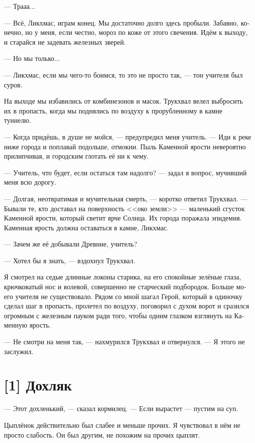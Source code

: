 \documentclass[a4paper,12pt,fleqn]{book}\usepackage{cooltooltips}\usepackage{polyglossia}\setdefaultlanguage[babelshorthands=true]{russian}\setotherlanguage{english}\defaultfontfeatures{Ligatures=TeX,Mapping=tex-text} \usepackage{xcolor}\definecolor{lightgray}{HTML}{bbbbbb}\color{lightgray}\newcommand{\ml}[3]{\textenglish{\textcolor{black}{#3}}}
\newcommand{\asterism}{\vspace{1em}{\centering\Large\bfseries$\ast~\ast~\ast$\par}\vspace{1em}}
\begin{document}
{--- Трааа...

--- Всё, Ликхмас, играм конец.
Мы достаточно долго здесь пробыли.
Забавно, конечно, но у меня, если честно, мороз по коже от этого свечения.
Идём к выходу, и старайся не задевать железных зверей.

--- Но мы только...

--- Ликхмас, если мы чего-то боимся, то это не просто так, --- тон учителя был суров.

\asterism

На выходе мы избавились от комбинезонов и масок.
Трукхвал велел выбросить их в пропасть, когда мы поднялись по воздуху к прорубленному в камне туннелю.

--- Когда придёшь, в душе не мойся, --- предупредил меня учитель.
--- Иди к реке ниже города и поплавай подольше, отмокни.
Пыль Каменной ярости невероятно прилипчивая, и городским глотать её ни к чему.

--- Учитель, что будет, если остаться там надолго? --- задал я вопрос, мучивший меня всю дорогу.

--- Долгая, неотвратимая и мучительная смерть, --- коротко ответил Трукхвал.
--- Бывали те, кто доставал на поверхность <<око земли>> --- маленький сгусток Каменной ярости, который светит ярче Солнца.
Их города поражала эпидемия.
Каменная ярость должна оставаться в камне, Ликхмас.

--- Зачем же её добывали Древние, учитель?

--- Хотел бы я знать, --- вздохнул Трукхвал.

Я смотрел на седые длинные локоны старика, на его спокойные зелёные глаза, крючковатый нос и волевой, совершенно не старческий подбородок.
Больше моего учителя не существовало.
Рядом со мной шагал Герой, который в одиночку сделал шаг в пропасть, пролетел по воздуху, поговорил с духом ворот и сразился огромным с железным пауком ради того, чтобы одним глазком взглянуть на Каменную ярость.

--- Не смотри на меня так, --- нахмурился Трукхвал и отвернулся.
--- Я этого не заслужил.

\section{[1] Дохляк}

--- Этот дохленький, --- сказал кормилец.
--- Если вырастет --- пустим на суп.

Цыплёнок действительно был слабее и меньше прочих.
Я чувствовал в нём не просто слабость.
Он был другим, не похожим на прочих цыплят.

}
\end{document}
